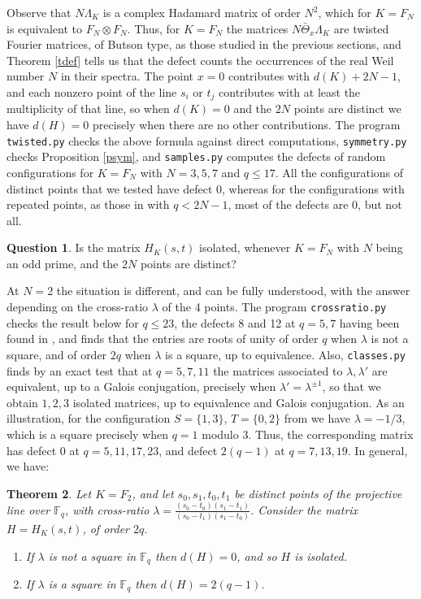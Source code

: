 \documentclass[11pt]{amsart}
\newtheorem{theorem}{Theorem}[section]
\theoremstyle{definition}
\newtheorem{question}[theorem]{Question}
\begin{document}
Observe that $N\Lambda_K$ is a complex Hadamard matrix of order $N^2$, which for $K=F_N$ is equivalent to $F_N\otimes F_N$. Thus, for $K=F_N$ the matrices $N\bar{\Theta}_x\Lambda_K$ are twisted Fourier matrices, of Butson type, as those studied in the previous sections, and Theorem \ref{tdef} tells us that the defect counts the occurrences of the real Weil number $N$ in their spectra. The point $x=0$ contributes with $d(K)+2N-1$, and each nonzero point of the line $s_i$ or $t_j$ contributes with at least the multiplicity of that line, so when $d(K)=0$ and the $2N$ points are distinct we have $d(H)=0$ precisely when there are no other contributions. The program {\tt twisted.py} checks the above formula against direct computations, {\tt symmetry.py} checks Proposition \ref{psym}, and {\tt samples.py} computes the defects of random configurations for $K=F_N$ with $N=3,5,7$ and $q\leq17$. All the configurations of distinct points that we tested have defect 0, whereas for the configurations with repeated points, as those in \cite{mwi} with $q<2N-1$, most of the defects are 0, but not all.

\begin{question}
Is the matrix $H_K(s,t)$ isolated, whenever $K=F_N$ with $N$ being an odd prime, and the $2N$ points are distinct?
\end{question}

At $N=2$ the situation is different, and can be fully understood, with the answer depending on the cross-ratio $\lambda$ of the 4 points. The program {\tt crossratio.py} checks the result below for $q\leq23$, the defects 8 and 12 at $q=5,7$ having been found in \cite{mwi}, and finds that the entries are roots of unity of order $q$ when $\lambda$ is not a square, and of order $2q$ when $\lambda$ is a square, up to equivalence. Also, {\tt classes.py} finds by an exact test that at $q=5,7,11$ the matrices associated to $\lambda,\lambda'$ are equivalent, up to a Galois conjugation, precisely when $\lambda'=\lambda^{\pm1}$, so that we obtain $1,2,3$ isolated matrices, up to equivalence and Galois conjugation. As an illustration, for the configuration $S=\{1,3\}$, $T=\{0,2\}$ from \cite{bop} we have $\lambda=-1/3$, which is a square precisely when $q=1$ modulo 3. Thus, the corresponding matrix has defect 0 at $q=5,11,17,23$, and defect $2(q-1)$ at $q=7,13,19$. In general, we have:

\begin{theorem}\label{ttwo}
Let $K=F_2$, and let $s_0,s_1,t_0,t_1$ be distinct points of the projective line over $\mathbb F_q$, with cross-ratio $\lambda=\frac{(s_0-t_0)(s_1-t_1)}{(s_0-t_1)(s_1-t_0)}$. Consider the matrix $H=H_K(s,t)$, of order $2q$.
\begin{enumerate}
\item If $\lambda$ is not a square in $\mathbb F_q$ then $d(H)=0$, and so $H$ is isolated.

\item If $\lambda$ is a square in $\mathbb F_q$ then $d(H)=2(q-1)$.
\end{enumerate}
\end{theorem}
\end{document}
